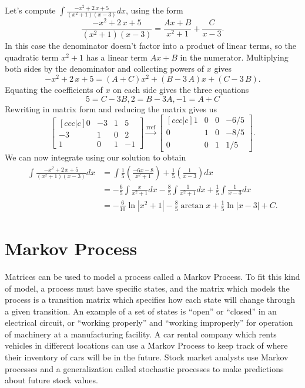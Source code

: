 \begin{example}
Let's compute $\int {\frac {-{x}^{2}+2\,x+5}{ \left( {x}^{2}+1 \right)  \left( x-3
 \right) }}dx$, using the form  
$${\frac {-{x}^{2}+2\,x+5}{ \left( {x}^{2}+1 \right)  \left( x-3
 \right) }}={\frac {Ax+B}{{x}^{2}+1}}+{\frac {C}{x-3}}.$$
In this case the denominator doesn't factor into a product of linear terms, so the quadratic term $x^2+1$ has a linear term $Ax+B$ in the numerator.  Multiplying both sides by the denominator and collecting powers of $x$ gives
$$-{x}^{2}+2\,x+5= \left( A+C \right) {x}^{2}+ \left( B-3\,A \right) x+(C-3\,B).$$
Equating the coefficients of $x$ on each side gives the three equations 
$$5=C-3B, 2=B-3A, -1=A+C$$
Rewriting in matrix form and reducing the matrix gives us
$$
\begin{bmatrix}[ccc|c] 
0&-3&1&5\\
-3&1&0&2\\
1&0&1&-1
\end {bmatrix}
\xrightarrow{\text{rref}}
\begin{bmatrix}[ccc|c]
1&0&0&-6/5\\
0&1&0&-8/5\\
0&0&1&1/5
\end {bmatrix} .
$$
We can now integrate using our solution to obtain 
\begin{align*}
\int {\frac {-{x}^{2}+2\,x+5}{ \left( {x}^{2}+1 \right)  \left( x-3\right) }}dx
&= \int {\frac{1}{5}\left(\frac {-6x-8}{{x}^{2}+1}\right)}+ \frac{1}{5}\left({\frac {1}{x-3}}\right)dx \\
&= -\frac{6}{5}\int \frac{x}{x^2+1}dx -\frac{8}{5}\int \frac{1}{x^2+1}dx +\frac{1}{5}\int{\frac {1}{x-3}}dx\\
&= -\frac{6}{10}\ln|{x^2+1}| -\frac{8}{5}\arctan x +\frac{1}{5}\ln|{x-3}|+C.
\end{align*}
\end{example}















\section{Markov Process}

Matrices can be used to model a process called a Markov Process. To fit this kind of model, a process must have specific states, and the matrix which models the process is a transition matrix which specifies how each state will change through a given transition. An example of a set of states is ``open'' or ``closed'' in an electrical circuit, or ``working properly'' and ``working improperly'' for operation of machinery at a manufacturing facility. A car rental company which rents vehicles in different locations can use a Markov Process to keep track of where their inventory of cars will be in the future. Stock market analysts use Markov processes and a generalization called stochastic processes to make predictions about future stock values.

